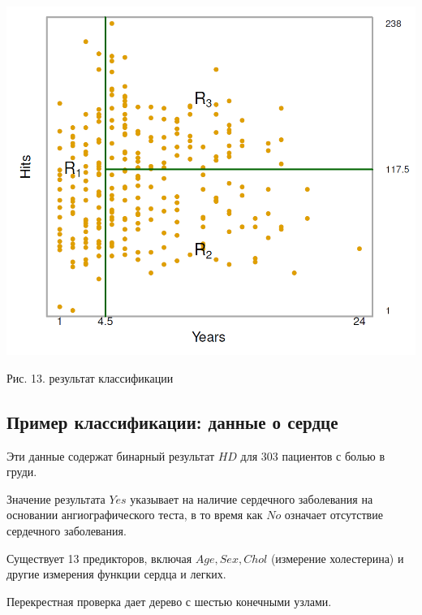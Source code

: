\documentclass{article}
\begin{document}
\begin{center}
	\includegraphics[scale=0.25]{pic65}
\end{center}
\begin{center}
	Рис. 13. результат классификации
\end{center}

\newpage

\subsection{Пример классификации: данные о сердце}

Эти данные содержат бинарный результат $HD$ для 303 пациентов с болью в груди.

Значение результата $Yes$ указывает на наличие сердечного заболевания на основании ангиографического теста, в то время как $No$ означает отсутствие сердечного заболевания.

Существует 13 предикторов, включая $Age, Sex, Chol$ (измерение холестерина) и другие измерения функции сердца и легких.

Перекрестная проверка дает дерево с шестью конечными узлами.
\end{document}
